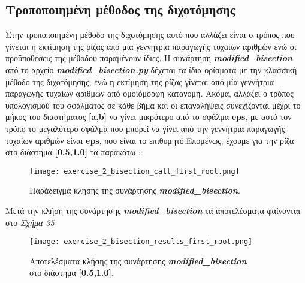 \documentclass[First Project.tex]{subfiles}
\begin{document}
\subsection{ Τροποποιημένη μέθοδος της διχοτόμησης }

Στην τροποποιημένη μέθοδο της διχοτόμησης αυτό που αλλάζει είναι ο τρόπος που γίνεται η εκτίμηση της ρίζας από μία γεννήτρια παραγωγής 
τυχαίων αριθμών ενώ οι προϋποθέσεις της μέθοδου παραμένουν ίδιες. Η συνάρτηση \textit{\textlatin{\textbf{modified\_bisection}}} από το αρχείο 
\textit{\textlatin{\textbf{modified\_bisection.py}}} δέχεται τα ίδια ορίσματα με την κλασσική μέθοδο της διχοτόμησης, ενώ η εκτίμηση της ρίζας
γίνεται από μία γεννήτρια παραγωγής τυχαίων αριθμών από ομοιόμορφη κατανομή. Ακόμα, αλλάζει ο τρόπος υπολογισμού του σφάλματος σε κάθε βήμα
και οι επαναλήψεις συνεχίζονται μέχρι το μήκος του διαστήματος \textlatin{\textbf{[a,b]}} να γίνει μικρότερο από το σφάλμα \textlatin{\textbf{eps}}, με
αυτό τον τρόπο το μεγαλύτερο σφάλμα που μπορεί να γίνει από την γεννήτρια παραγωγής τυχαίων αριθμών είναι \textlatin{\textbf{eps}}, που είναι
το επιθυμητό.Επομένως, έχουμε για την ρίζα στο διάστημα \textbf{[0.5,1.0]} τα παρακάτω :
\vspace{5px}
\begin{figure}[h!]
    \centering
    \captionsetup{justification=centering}
    \begin{center}
        \texttt{[image: exercise\_2\_bisection\_call\_first\_root.png]}    
        \caption{Παράδειγμα κλήσης της συνάρτησης \textit{\textlatin{\textbf{modified\_bisection}}}.}
    \end{center}
\end{figure}

Μετά την κλήση της συνάρτησης \textit{\textlatin{\textbf{modified\_bisection}}} τα αποτελέσματα φαίνονται στο \textit{Σχήμα 35}

\vspace{5px}
\begin{figure}[h!]
    \centering
    \captionsetup{justification=centering}
    \begin{center}
    \texttt{[image: exercise\_2\_bisection\_results\_first\_root.png]}    
    \caption{ Αποτελέσματα κλήσης της συνάρτησης \textit{\textlatin{\textbf{modified\_bisection}}} \\ στο διάστημα \textbf{[0.5,1.0]}. }
    \end{center}
\end{figure}
\end{document}

